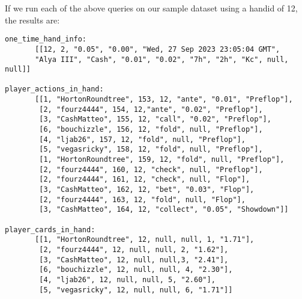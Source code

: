 \documentclass{article}
\begin{document}
        If we run each of the above queries on our sample dataset using a hand\textunderscore id of 12, the results are:
        \begin{verbatim}
one_time_hand_info: 
       [[12, 2, "0.05", "0.00", "Wed, 27 Sep 2023 23:05:04 GMT", 
       "Alya III", "Cash", "0.01", "0.02", "7h", "2h", "Kc", null, null]]

player_actions_in_hand: 
       [[1, "HortonRoundtree", 153, 12, "ante", "0.01", "Preflop"],
        [2, "fourz4444", 154, 12,"ante", "0.02", "Preflop"],
        [3, "CashMatteo", 155, 12, "call", "0.02", "Preflop"],
        [6, "bouchizzle", 156, 12, "fold", null, "Preflop"],
        [4, "ljab26", 157, 12, "fold", null, "Preflop"],
        [5, "vegasricky", 158, 12, "fold", null, "Preflop"],
        [1, "HortonRoundtree", 159, 12, "fold", null, "Preflop"],
        [2, "fourz4444", 160, 12, "check", null, "Preflop"],
        [2, "fourz4444", 161, 12, "check", null, "Flop"],
        [3, "CashMatteo", 162, 12, "bet", "0.03", "Flop"],
        [2, "fourz4444", 163, 12, "fold", null, "Flop"],
        [3, "CashMatteo", 164, 12, "collect", "0.05", "Showdown"]]

player_cards_in_hand: 
       [[1, "HortonRoundtree", 12, null, null, 1, "1.71"],
        [2, "fourz4444", 12, null, null, 2, "1.62"],
        [3, "CashMatteo", 12, null, null,3, "2.41"],
        [6, "bouchizzle", 12, null, null, 4, "2.30"],
        [4, "ljab26", 12, null, null, 5, "2.60"],
        [5, "vegasricky", 12, null, null, 6, "1.71"]]

        \end{verbatim}
\end{document}
